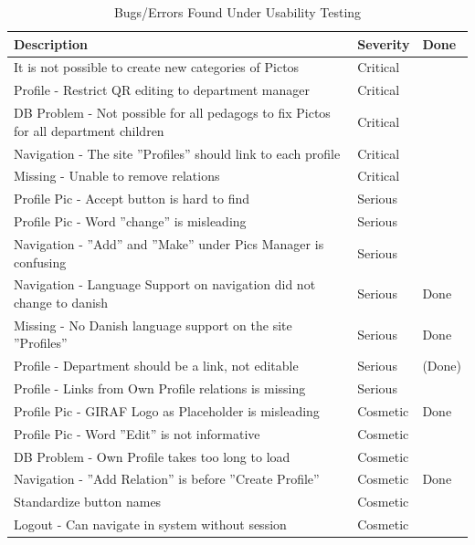 \begin{table}[htbp]
	\centering
		\begin{tabularx}{\textwidth}{|X|l|l|}
			\hline
			Description & Severity & Done\\\hline\hline
			It is not possible to create new categories of Pictos & Critical &\\\hline
			Profile - Restrict QR editing to department manager & Critical &  \\\hline 
			DB Problem - Not possible for all pedagogs to fix Pictos for all department children & Critical & \\\hline
			Navigation - The site ''Profiles'' should link to each profile & Critical &\\\hline
			Missing - Unable to remove relations & Critical & \\\hline
			Profile Pic - Accept button is hard to find & Serious &\\\hline
			Profile Pic - Word ''change'' is misleading & Serious &\\\hline
			Navigation - ''Add'' and ''Make'' under Pics Manager is confusing & Serious & \\\hline
			Navigation - Language Support on navigation did not change to danish & Serious & Done\\\hline
			Missing - No Danish language support on the site ''Profiles''& Serious & Done\\\hline
			Profile - Department should be a link, not editable & Serious & (Done)\\\hline
			Profile - Links from Own Profile relations is missing & Serious & \\\hline
			Profile Pic - GIRAF Logo as Placeholder is misleading  & Cosmetic & Done\\\hline
			Profile Pic - Word ''Edit'' is not informative & Cosmetic &\\\hline
			DB Problem - Own Profile takes too long to load & Cosmetic &  \\\hline
			Navigation - ''Add Relation''  is before ''Create Profile'' & Cosmetic & Done \\\hline
			Standardize button names & Cosmetic & \\\hline
			Logout - Can navigate in system without session & Cosmetic & \\\hline
	\end{tabularx}
	\caption{Bugs/Errors Found Under Usability Testing}
	\label{tab:Bugs/Errors}
\end{table}

